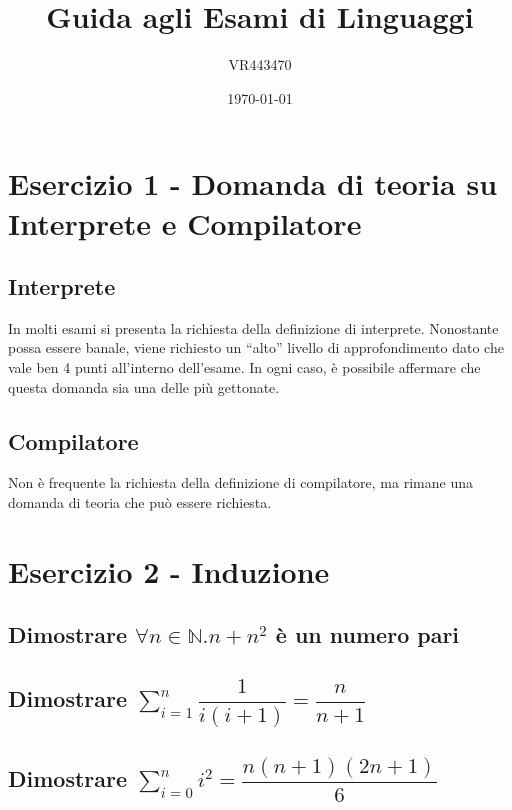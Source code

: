 \documentclass[a4paper]{article}
\newcommand{\dquotes}[1]{``#1''}
\begin{document}
	\author{VR443470}
	\title{Guida agli Esami di Linguaggi}
	\date{\printdayoff\today}
	\maketitle
	
	\newpage
	
	\tableofcontents
	
	\newpage
	
	\section{Esercizio 1 - Domanda di teoria su Interprete e Compilatore}
	
	\subsection{Interprete}
	
	In molti esami si presenta la richiesta della definizione di interprete. Nonostante possa essere banale, viene richiesto un \dquotes{alto} livello di approfondimento dato che vale ben 4 punti all'interno dell'esame. In ogni caso, è possibile affermare che questa domanda sia una delle più gettonate.
	
	\subsection{Compilatore}
	
	Non è frequente la richiesta della definizione di compilatore, ma rimane una domanda di teoria che può essere richiesta.
	
	\section{Esercizio 2 - Induzione}
	
	\subsection{Dimostrare $\forall n \in \mathbb{N}.n + n^{2}$ è un numero pari}
	
	\subsection{Dimostrare $\displaystyle\sum_{i=1}^{n}\dfrac{1}{i\left(i+1\right)} = \dfrac{n}{n+1}$}
	
	\subsection{Dimostrare $\displaystyle\sum_{i=0}^{n} i^{2} = \dfrac{n\left(n+1\right)\left(2n+1\right)}{6}$}
	
\end{document}
